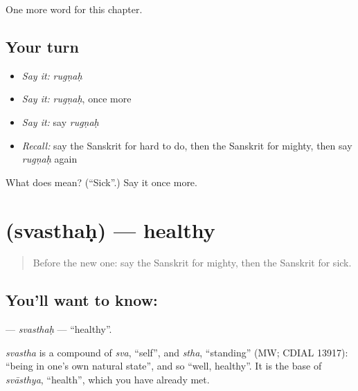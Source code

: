 \begin{grammarlens}[title={What you've built}]
One more word for this chapter.
\end{grammarlens}

\subsection*{Your turn}
\begin{itemize}
\raggedright
  \item \emph{Say it:} \emph{rugṇaḥ}
  \item \emph{Say it:} \emph{rugṇaḥ}, once more
  \item \emph{Say it:} say \emph{rugṇaḥ}
  \item \emph{Recall:} say the Sanskrit for hard to do, then the Sanskrit for mighty, then say \emph{rugṇaḥ} again
\end{itemize}

\begin{tcolorbox}[breakable,colback=teal!4,colframe=teal!35!black,title={Before you move on}]
What does  mean? (\textquotedblleft{}Sick\textquotedblright{}.) Say it once more.
\end{tcolorbox}
\section[\texorpdfstring{\sk{स्वस्थः} (svasthaḥ)}{स्वस्थः (svasthaḥ)}]{ (svasthaḥ) — healthy}

\label{lesson:SA-C243-svasthah}



\begin{quote}
Before the new one: say the Sanskrit for mighty, then the Sanskrit for sick.
\end{quote}

\subsection*{You'll want to know: }
\textbf{} — \emph{svasthaḥ} — \textquotedblleft{}healthy\textquotedblright{}.

\begin{cousinweb}
\emph{svastha} is a compound of \emph{sva}, \textquotedblleft{}self\textquotedblright{}, and \emph{stha}, \textquotedblleft{}standing\textquotedblright{} (MW; CDIAL 13917): \textquotedblleft{}being in one's own natural state\textquotedblright{}, and so \textquotedblleft{}well, healthy\textquotedblright{}. It is the base of \emph{svāsthya}, \textquotedblleft{}health\textquotedblright{}, which you have already met.
\end{cousinweb}


